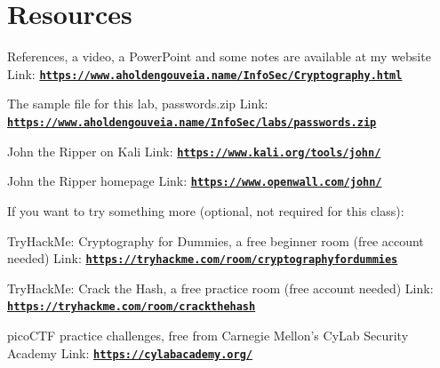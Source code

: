 \documentclass[12pt]{article}
\begin{document}
\section*{Resources}
References, a video, a PowerPoint and some notes are available at my website
Link: \href{https://www.aholdengouveia.name/InfoSec/Cryptography.html}{\textbf{\nolinkurl{https://www.aholdengouveia.name/InfoSec/Cryptography.html}}}

The sample file for this lab, passwords.zip
Link: \href{https://www.aholdengouveia.name/InfoSec/labs/passwords.zip}{\textbf{\nolinkurl{https://www.aholdengouveia.name/InfoSec/labs/passwords.zip}}}

John the Ripper on Kali
Link: \href{https://www.kali.org/tools/john/}{\textbf{\nolinkurl{https://www.kali.org/tools/john/}}}

John the Ripper homepage
Link: \href{https://www.openwall.com/john/}{\textbf{\nolinkurl{https://www.openwall.com/john/}}}

If you want to try something more (optional, not required for this class):

TryHackMe: Cryptography for Dummies, a free beginner room (free account needed)
Link: \href{https://tryhackme.com/room/cryptographyfordummies}{\textbf{\nolinkurl{https://tryhackme.com/room/cryptographyfordummies}}}

TryHackMe: Crack the Hash, a free practice room (free account needed)
Link: \href{https://tryhackme.com/room/crackthehash}{\textbf{\nolinkurl{https://tryhackme.com/room/crackthehash}}}

picoCTF practice challenges, free from Carnegie Mellon's CyLab Security Academy
Link: \href{https://cylabacademy.org/}{\textbf{\nolinkurl{https://cylabacademy.org/}}}
\end{document}

